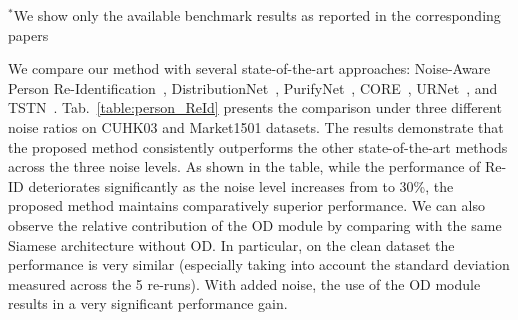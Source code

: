 \documentclass[lettersize,journal]{IEEEtran}
\begin{document}
\begin{table}[!t]
\caption{Comparison of Person Re-ID performance of Beta-SOD against PurifyNet~\cite{20}, CORE~\cite{22}, and TSNT~\cite{23} on the Market1501 and CUHK03 datasets with various {\bf PATTERN NOISE} levels (5 runs Average and Standard Deviation)}
{\noindent \small \qquad $^*$We show only the available benchmark results as reported in the corresponding papers}
\label{tab:ReId_pattern}
\end{table}

\vskip 0.15cm
We compare our method with several state-of-the-art approaches: Noise-Aware Person Re-Identification~\cite{21}, DistributionNet~\cite{19}, PurifyNet~\cite{20}, CORE~\cite{22}, URNet~\cite{URNet}, and TSTN~\cite{23}. Tab.~\ref{table:person_ReId} presents the comparison under three different noise ratios on CUHK03 and Market1501 datasets. The results demonstrate that the proposed method consistently outperforms the other state-of-the-art methods across the three noise levels. As shown in the table, while the performance of Re-ID deteriorates significantly as the noise level increases from to 30\%, the proposed method maintains comparatively superior performance. We can also observe the relative contribution of the OD module by comparing with the same Siamese architecture without OD. In particular, on the clean dataset the performance is very similar (especially taking into account the standard deviation measured across the 5 re-runs). With added noise, the use of the OD module results in a very significant performance gain.
\end{document}
